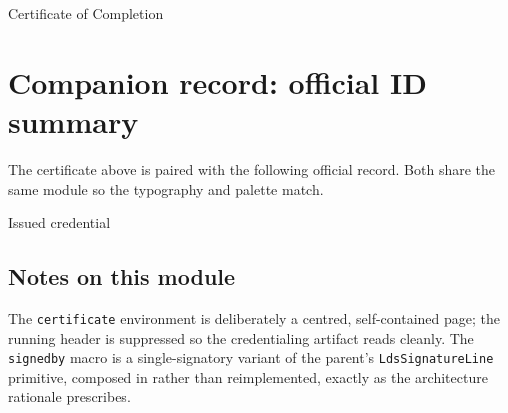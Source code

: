 \documentclass[11pt]{article}
\begin{document}
\begin{certificate}{Certificate of Completion}
\end{certificate}

\clearpage
\makedoctitle

\section*{Companion record: official ID summary}

The certificate above is paired with the following official record. Both
share the same module so the typography and palette match.

\begin{idcard}{Issued credential}
\end{idcard}

\subsection*{Notes on this module}
The \texttt{certificate} environment is deliberately a centred,
self-contained page; the running header is suppressed so the
credentialing artifact reads cleanly. The \texttt{signedby} macro is
a single-signatory variant of the parent's \texttt{LdsSignatureLine}
primitive, composed in rather than reimplemented, exactly as the
architecture rationale prescribes.
\end{document}
